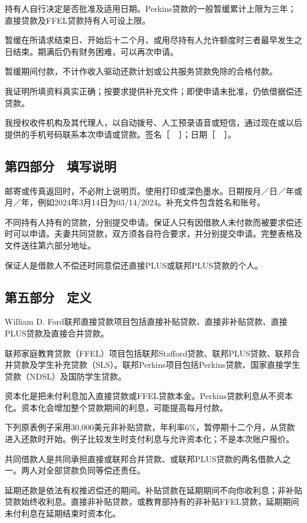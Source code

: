 \documentclass[UTF8,fontset=none,11pt,a4paper]{ctexart}
\begin{document}
持有人自行决定是否批准及适用日期。Perkins贷款的一般暂缓累计上限为三年；直接贷款及FFEL贷款持有人可设上限。


暂缓在所请求结束日、开始后十二个月、或用尽持有人允许额度时三者最早发生之日结束。期满后仍有财务困难，可以再次申请。


暂缓期间付款，不计作收入驱动还款计划或公共服务贷款免除的合格付款。


我证明所填资料真实正确；按要求提供补充文件；即使申请未批准，仍依借据偿还贷款。


我授权收件机构及其代理人，以自动拨号、人工预录语音或短信，通过现在或以后提供的手机号码联系本次申请或贷款。签名［　］；日期［　］。


\subsection*{第四部分　填写说明}
邮寄或传真返回时，不必附上说明页。使用打印或深色墨水。日期按月／日／年或月／年，例如2024年3月14日为03/14/2024。补充文件包含姓名和账号。


不同持有人持有的贷款，分别提交申请。保证人只有因借款人未付款而被要求偿还时可以申请。夫妻共同贷款，双方须各自符合要求，并分别提交申请。完整表格及文件送往第六部分地址。


保证人是借款人不偿还时同意偿还直接PLUS或联邦PLUS贷款的个人。


\subsection*{第五部分　定义}
William D. Ford联邦直接贷款项目包括直接补贴贷款、直接非补贴贷款、直接PLUS贷款及直接合并贷款。


联邦家庭教育贷款（FFEL）项目包括联邦Stafford贷款、联邦PLUS贷款、联邦合并贷款及学生补充贷款（SLS）。联邦Perkins项目包括Perkins贷款、国家直接学生贷款（NDSL）及国防学生贷款。


资本化是把未付利息加入直接贷款或FFEL贷款本金。Perkins贷款利息从不资本化。资本化会增加整个贷款期间的利息，可能提高每月付款。


下列原表例子采用30,000美元非补贴贷款，年利率6\%，暂停期十二个月，从贷款进入还款时开始。例子比较发生时支付利息与允许资本化；不是本次账户报价。


共同借款人是共同承担直接或联邦合并贷款、或联邦PLUS贷款的两名借款人之一。两人对全部贷款负同等偿还责任。


延期还款是依法有权推迟偿还的期间。补贴贷款在延期期间不向你收利息；非补贴贷款始终收利息。直接非补贴贷款，或教育部持有的非补贴FFEL贷款，延期期间未付利息在延期结束时资本化。
\end{document}
